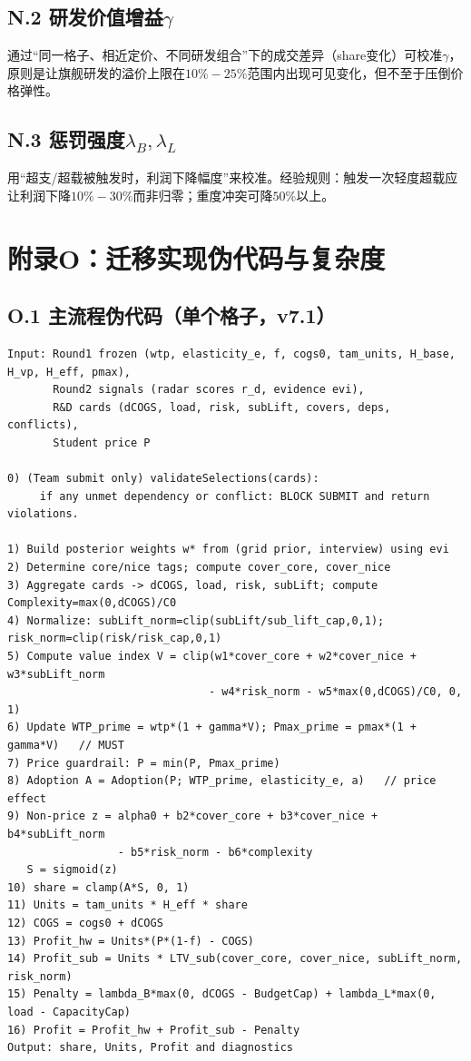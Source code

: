 \documentclass[UTF8,12pt]{ctexart}
\begin{document}
\subsection{N.2 研发价值增益$\gamma$}
通过“同一格子、相近定价、不同研发组合”下的成交差异（share变化）可校准$\gamma$，原则是让旗舰研发的溢价上限在$10\%-25\%$范围内出现可见变化，但不至于压倒价格弹性。

\subsection{N.3 惩罚强度$\lambda_B,\lambda_L$}
用“超支/超载被触发时，利润下降幅度”来校准。经验规则：触发一次轻度超载应让利润下降$10\%-30\%$而非归零；重度冲突可降$50\%$以上。

\section{附录O：迁移实现伪代码与复杂度}
\subsection{O.1 主流程伪代码（单个格子，v7.1）}
\begin{verbatim}
Input: Round1 frozen (wtp, elasticity_e, f, cogs0, tam_units, H_base, H_vp, H_eff, pmax),
       Round2 signals (radar scores r_d, evidence evi),
       R&D cards (dCOGS, load, risk, subLift, covers, deps, conflicts),
       Student price P

0) (Team submit only) validateSelections(cards):
     if any unmet dependency or conflict: BLOCK SUBMIT and return violations.

1) Build posterior weights w* from (grid prior, interview) using evi
2) Determine core/nice tags; compute cover_core, cover_nice
3) Aggregate cards -> dCOGS, load, risk, subLift; compute Complexity=max(0,dCOGS)/C0
4) Normalize: subLift_norm=clip(subLift/sub_lift_cap,0,1); risk_norm=clip(risk/risk_cap,0,1)
5) Compute value index V = clip(w1*cover_core + w2*cover_nice + w3*subLift_norm
                               - w4*risk_norm - w5*max(0,dCOGS)/C0, 0, 1)
6) Update WTP_prime = wtp*(1 + gamma*V); Pmax_prime = pmax*(1 + gamma*V)   // MUST
7) Price guardrail: P = min(P, Pmax_prime)
8) Adoption A = Adoption(P; WTP_prime, elasticity_e, a)   // price effect
9) Non-price z = alpha0 + b2*cover_core + b3*cover_nice + b4*subLift_norm
                 - b5*risk_norm - b6*complexity
   S = sigmoid(z)
10) share = clamp(A*S, 0, 1)
11) Units = tam_units * H_eff * share
12) COGS = cogs0 + dCOGS
13) Profit_hw = Units*(P*(1-f) - COGS)
14) Profit_sub = Units * LTV_sub(cover_core, cover_nice, subLift_norm, risk_norm)
15) Penalty = lambda_B*max(0, dCOGS - BudgetCap) + lambda_L*max(0, load - CapacityCap)
16) Profit = Profit_hw + Profit_sub - Penalty
Output: share, Units, Profit and diagnostics
\end{verbatim}
\end{document}
